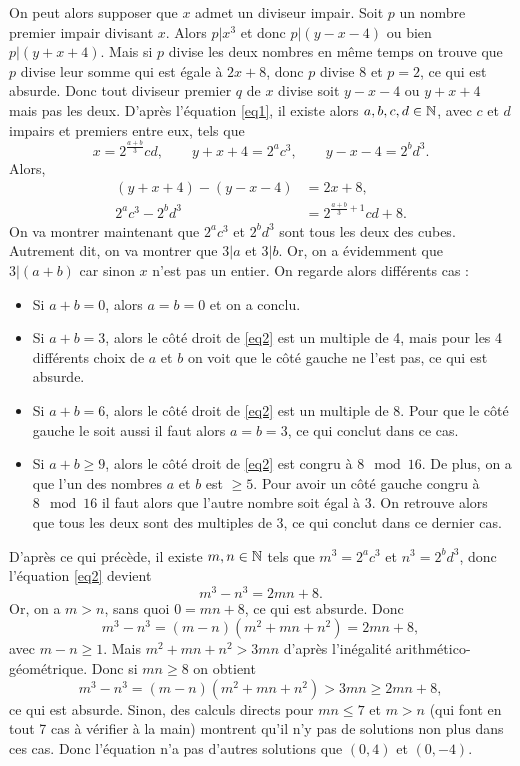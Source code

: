 \begin{sol}[116]
On peut alors supposer que $x$ admet un diviseur impair. Soit $p$ un nombre premier impair divisant $x$. Alors $p|x^3$ et donc $p|(y-x-4)$ ou bien $p|(y+x+4)$. Mais si $p$ divise les deux nombres en m\^eme temps on trouve que $p$ divise leur somme qui est \'egale \`a $2x+8$, donc $p$ divise $8$ et $p=2$, ce qui est absurde. Donc tout diviseur premier $q$ de $x$ divise soit $y-x-4$ ou $y+x+4$ mais pas les deux. D'apr\`es l'\'equation \eqref{eq1}, il existe alors $a,b,c,d\in\mathbb{N}$, avec $c$ et $d$ impairs et premiers entre eux, tels que
\[x=2^{\frac{a+b}{3}}cd,\qquad y+x+4=2^ac^3,\qquad y-x-4=2^bd^3.\]
Alors,
\begin{align*}
(y+x+4)-(y-x-4) &=2x+8,\\
2^ac^3-2^bd^3&=2^{\frac{a+b}{3}+1}cd+8.\tag{2}\label{eq2}
\end{align*}
On va montrer maintenant que $2^ac^3$ et $2^bd^3$ sont tous les deux des cubes. Autrement dit, on va montrer que $3|a$ et $3|b$. Or, on a \'evidemment que $3|(a+b)$ car sinon $x$ n'est pas un entier. On regarde alors diff\'erents cas :
\begin{itemize}
\item Si $a+b=0$, alors $a=b=0$ et on a conclu.
\item Si $a+b=3$, alors le c\^ot\'e droit de \eqref{eq2} est un multiple de 4, mais pour les 4 diff\'erents choix de $a$ et $b$ on voit que le c\^ot\'e gauche ne l'est pas, ce qui est absurde.
\item Si $a+b=6$, alors le c\^ot\'e droit de \eqref{eq2} est un multiple de 8. Pour que le c\^ot\'e gauche le soit aussi il faut alors $a=b=3$, ce qui conclut dans ce cas.
\item Si $a+b\geq 9$, alors le c\^ot\'e droit de \eqref{eq2} est congru \`a $8\mod 16$. De plus, on a que l'un des nombres $a$ et $b$ est $\geq 5$. Pour avoir un c\^ot\'e gauche congru \`a $8\mod 16$ il faut alors que l'autre nombre soit \'egal \`a $3$. On retrouve alors que tous les deux sont des multiples de 3, ce qui conclut dans ce dernier cas.\\
\end{itemize}

D'apr\`es ce qui pr\'ec\`ede, il existe $m,n\in\mathbb{N}$ tels que $m^3=2^ac^3$ et $n^3=2^bd^3$, donc l'\'equation \eqref{eq2} devient
\[m^3-n^3=2mn+8.\]
Or, on a $m>n$, sans quoi $0=mn+8$, ce qui est absurde. Donc
\[m^3-n^3=(m-n)(m^2+mn+n^2)=2mn+8,\]
avec $m-n\geq 1$. Mais $m^2+mn+n^2 >3mn$ d'apr\`es l'in\'egalit\'e arithm\'etico-g\'eom\'etrique. Donc si $mn\geq 8$ on obtient
\[m^3-n^3=(m-n)(m^2+mn+n^2)> 3mn\geq 2mn+8,\]
ce qui est absurde. Sinon, des calculs directs pour $mn\leq 7$ et $m>n$ (qui font en tout 7 cas \`a v\'erifier \`a la main) montrent qu'il n'y pas de solutions non plus dans ces cas. Donc l'\'equation n'a pas d'autres solutions que $(0,4)$ et $(0,-4)$.
\end{sol}

